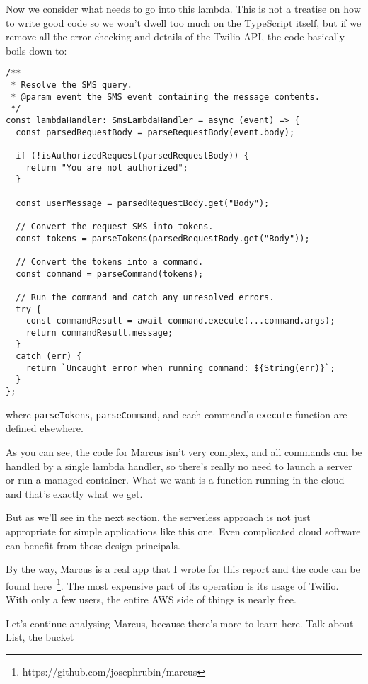 \documentclass{article}
\begin{document}
Now we consider what needs to go into this lambda.
This is not a treatise on how to write good code so we won't dwell too much on the TypeScript itself, but if we remove all the error checking and details of the Twilio API, the code basically boils down to:

\begin{verbatim}
/**
 * Resolve the SMS query.
 * @param event the SMS event containing the message contents.
 */
const lambdaHandler: SmsLambdaHandler = async (event) => {
  const parsedRequestBody = parseRequestBody(event.body);

  if (!isAuthorizedRequest(parsedRequestBody)) {
    return "You are not authorized";
  }

  const userMessage = parsedRequestBody.get("Body");

  // Convert the request SMS into tokens.
  const tokens = parseTokens(parsedRequestBody.get("Body"));

  // Convert the tokens into a command.
  const command = parseCommand(tokens);

  // Run the command and catch any unresolved errors.
  try {
    const commandResult = await command.execute(...command.args);
    return commandResult.message;
  }
  catch (err) {
    return `Uncaught error when running command: ${String(err)}`;
  }
};
\end{verbatim}

where \texttt{parseTokens}, \texttt{parseCommand}, and each command's \texttt{execute} function are defined elsewhere.

As you can see, the code for Marcus isn't very complex, and all commands can be handled by a single lambda handler, so there's really no need to launch a server or run a managed container.
What we want is a function running in the cloud and that's exactly what we get.

But as we'll see in the next section, the serverless approach is not just appropriate for simple applications like this one.
Even complicated cloud software can benefit from these design principals.

By the way, Marcus is a real app that I wrote for this report and the code can be found here~\footnote{https://github.com/josephrubin/marcus}.
The most expensive part of its operation is its usage of Twilio.
With only a few users, the entire AWS side of things is nearly free.

Let's continue analysing Marcus, because there's more to learn here.
Talk about List, the bucket
\end{document}
